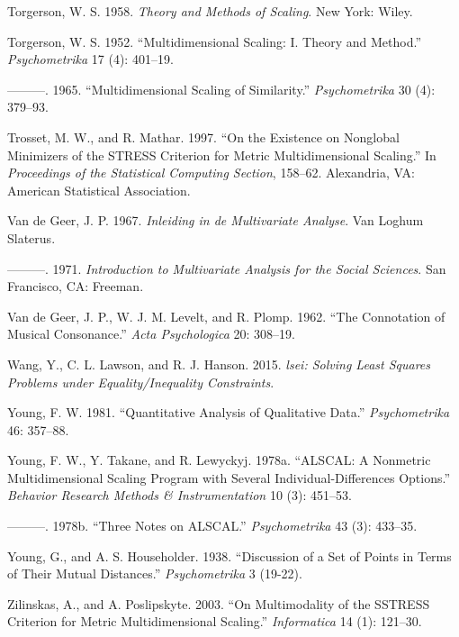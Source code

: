 \documentclass[
  12pt,
  letterpaper,
  DIV=11,
  numbers=noendperiod]{scrreprt}
\newlength{\cslhangindent}
\newenvironment{CSLReferences}[2] %
 {\begin{list}{}{%
  \setlength{\itemindent}{0pt}
  \setlength{\leftmargin}{0pt}
  \setlength{\parsep}{0pt}
  \ifodd #1
   \setlength{\leftmargin}{\cslhangindent}
   \setlength{\itemindent}{-1\cslhangindent}
  \fi
  \setlength{\itemsep}{#2\baselineskip}}}
 {\end{list}}
\theoremstyle{remark}
\begin{document}
\begin{CSLReferences}{1}{0}
Torgerson, W. S. 1958. \emph{{Theory and Methods of Scaling}}. New York:
Wiley.

Torgerson, W. S. 1952. {``{Multidimensional Scaling: I. Theory and
Method}.''} \emph{Psychometrika} 17 (4): 401--19.

---------. 1965. {``{Multidimensional Scaling of Similarity}.''}
\emph{Psychometrika} 30 (4): 379--93.

Trosset, M. W., and R. Mathar. 1997. {``{On the Existence on Nonglobal
Minimizers of the STRESS Criterion for Metric Multidimensional
Scaling}.''} In \emph{Proceedings of the Statistical Computing Section},
158--62. Alexandria, VA: American Statistical Association.

Van de Geer, J. P. 1967. \emph{{Inleiding in de Multivariate Analyse}}.
Van Loghum Slaterus.

---------. 1971. \emph{{Introduction to Multivariate Analysis for the
Social Sciences}}. San Francisco, CA: Freeman.

Van de Geer, J. P., W. J. M. Levelt, and R. Plomp. 1962. {``{The
Connotation of Musical Consonance}.''} \emph{Acta Psychologica} 20:
308--19.

Wang, Y., C. L. Lawson, and R. J. Hanson. 2015. \emph{{lsei: Solving
Least Squares Problems under Equality/Inequality Constraints}}.

Young, F. W. 1981. {``{Quantitative Analysis of Qualitative Data}.''}
\emph{Psychometrika} 46: 357--88.

Young, F. W., Y. Takane, and R. Lewyckyj. 1978a. {``{ALSCAL: A Nonmetric
Multidimensional Scaling Program with Several Individual-Differences
Options}.''} \emph{Behavior Research Methods \& Instrumentation} 10 (3):
451--53.

---------. 1978b. {``{Three Notes on ALSCAL}.''} \emph{Psychometrika} 43
(3): 433--35.

Young, G., and A. S. Householder. 1938. {``{Discussion of a Set of
Points in Terms of Their Mutual Distances}.''} \emph{Psychometrika} 3
(19-22).

Zilinskas, A., and A. Poslipskyte. 2003. {``{On Multimodality of the
SSTRESS Criterion for Metric Multidimensional Scaling}.''}
\emph{Informatica} 14 (1): 121--30.

\end{CSLReferences}
\end{document}
